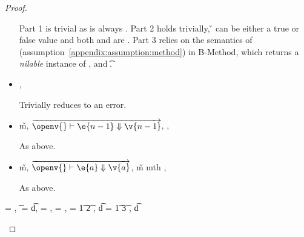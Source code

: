 \begin{lemma}
\begin{proof}
\begin{case}[T-MethodStatic]
\begin{itemize}
\begin{subcase}[B-Method]
Part 1 is trivial as \object{} is always \emptyobject{}.
Part 2 holds trivially, \v{} can be either a true or false value
and both {\thenprop{\prop{}}} and {\elseprop{\prop{}}}
are \topprop{}.
Part 3 relies on the semantics of \invokejavamethodliteral (assumption~\ref{appendix:assumption:method})
in B-Method, which returns a \emph{nilable} instance of ,
and  {\t{}}.
\end{subcase}

  \item[]
\begin{subcase}[BE-Method1]
  \opsem {\openv{}}
         {}
         {\errorval{\v{}}},
  \opsem {\openv{}}
         {\e{}}
         {\errorval{\v{}}}

         Trivially reduces to an error.
\end{subcase}
  \item[]
\begin{subcase}[BE-Method2]
  \opsem {\openv{}}
         {}
         {\v{m}},
 $\overrightarrow{
  \opsem {\openv{}}
         {\e{n-1}}
         {\v{n-1}}
       }$,
  \opsem {\openv{}}
         {}
         {\errorval{\v{}}},
  \opsem {\openv{}}
         {\e{}}
         {\errorval{\v{}}}

  As above.
\end{subcase}
  \item[]
\begin{subcase}[BE-Method3]
  \opsem {\openv{}}
         {}
         {\v{m}},
  $\overrightarrow{
  \opsem {\openv{}}
         {\e{a}}
         {\v{a}}
       }$,
   {\v{m}} {mth}
                    {} {}
                    {}
                    {\errorvalv{}},
  \opsem {\openv{}} {\e{}} {\errorvalv{}}

  As above.

\end{subcase}
\end{itemize}

\end{case}

\begin{case}[T-DefMulti]
  \e{} = {\createmultiexp {\s{}} {}},
  \t{} = {\MultiFntype {\s{}} {\t{d}}},
  \thenprop{\prop{}} = {\topprop{}},
  \elseprop{\prop{}} = {\botprop{}},
  \s{} = {\ArrowOne {\x{}} {\t{1}} {\t{2}}
                          {
                                      {}}
                          {}},
  \t{d} = {\ArrowOne {\x{}} {\t{1}} {\t{3}}
                          {
                                      {}}
                          {}},
  \judgementtwo {\propenv{}} { {\t{d}}}



\end{case}
\end{proof}
\end{lemma}
